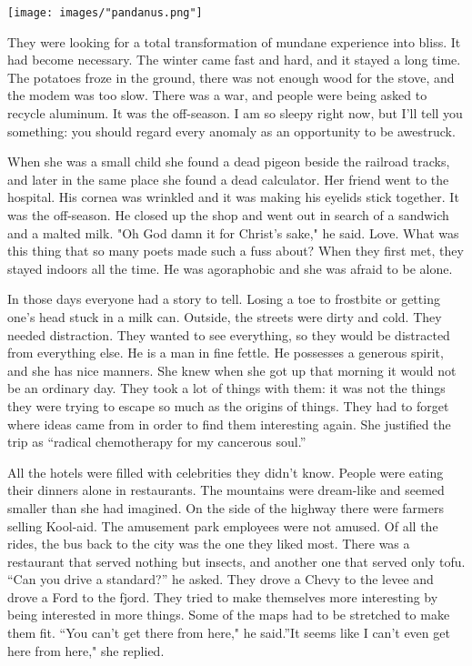 \documentclass[
]{memoir}
\begin{document}
\begin{center}\texttt{[image: images/"pandanus.png"]}\end{center}

They were looking for a total transformation of mundane experience into
bliss. It had become necessary. The winter came fast and hard, and it
stayed a long time. The potatoes froze in the ground, there was not
enough wood for the stove, and the modem was too slow. There was a war,
and people were being asked to recycle aluminum. It was the off-season.
I am so sleepy right now, but I'll tell you something: you should regard
every anomaly as an opportunity to be awestruck.

When she was a small child she found a dead pigeon beside the railroad
tracks, and later in the same place she found a dead calculator. Her
friend went to the hospital. His cornea was wrinkled and it was making
his eyelids stick together. It was the off-season. He closed up the shop
and went out in search of a sandwich and a malted milk. "Oh God damn it
for Christ's sake," he said. Love. What was this thing that so many
poets made such a fuss about? When they first met, they stayed indoors
all the time. He was agoraphobic and she was afraid to be alone.

In those days everyone had a story to tell. Losing a toe to frostbite or
getting one's head stuck in a milk can. Outside, the streets were dirty
and cold. They needed distraction. They wanted to see everything, so
they would be distracted from everything else. He is a man in fine
fettle. He possesses a generous spirit, and she has nice manners. She
knew when she got up that morning it would not be an ordinary day. They
took a lot of things with them: it was not the things they were trying
to escape so much as the origins of things. They had to forget where
ideas came from in order to find them interesting again. She justified
the trip as ``radical chemotherapy for my cancerous soul.''

All the hotels were filled with celebrities they didn't know. People
were eating their dinners alone in restaurants. The mountains were
dream-like and seemed smaller than she had imagined. On the side of the
highway there were farmers selling Kool-aid. The amusement park
employees were not amused. Of all the rides, the bus back to the city
was the one they liked most. There was a restaurant that served nothing
but insects, and another one that served only tofu. ``Can you drive a
standard?'' he asked. They drove a Chevy to the levee and drove a Ford
to the fjord. They tried to make themselves more interesting by being
interested in more things. Some of the maps had to be stretched to make
them fit. ``You can't get there from here," he said.''It seems like I
can't even get here from here," she replied.
\end{document}
